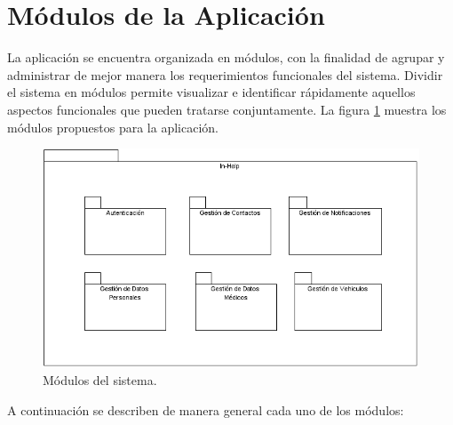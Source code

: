 
\section{Módulos de la Aplicación}

La aplicación se encuentra organizada en módulos, con la finalidad de agrupar y administrar de mejor manera los requerimientos funcionales del sistema. Dividir el sistema en módulos permite visualizar e identificar rápidamente aquellos aspectos funcionales que pueden tratarse conjuntamente. La figura \ref{fig:modulos} muestra los módulos propuestos para la aplicación.

\begin{figure}[h!]
	\begin{center}
		\includegraphics[scale=0.7]{ModeloComportamiento/imagenes/modulosSistema.png}
		\caption{Módulos del sistema.}
		\label{fig:modulos}
	\end{center}
\end{figure}
\pagebreak

A continuación se describen de manera general cada uno de los módulos:

